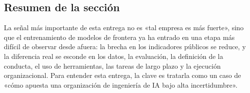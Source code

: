 \subsection{Resumen de la sección}

La señal más importante de esta entrega no es «tal empresa es más fuerte», sino que el entrenamiento de modelos de frontera ya ha entrado en una etapa más difícil de observar desde afuera: la brecha en los indicadores públicos se reduce, y la diferencia real se esconde en los datos, la evaluación, la definición de la conducta, el uso de herramientas, las tareas de largo plazo y la ejecución organizacional. Para entender esta entrega, la clave es tratarla como un caso de «cómo apuesta una organización de ingeniería de IA bajo alta incertidumbre».

